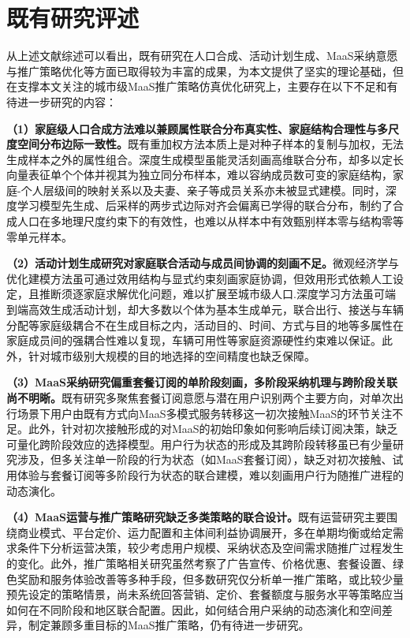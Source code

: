 \section{既有研究评述}\label{sec.review.comment}

从上述文献综述可以看出，既有研究在人口合成、活动计划生成、MaaS采纳意愿与推广策略优化等方面已取得较为丰富的成果，为本文提供了坚实的理论基础，但在支撑本文关注的城市级MaaS推广策略仿真优化研究上，主要存在以下不足和有待进一步研究的内容：

\textbf{（1）家庭级人口合成方法难以兼顾属性联合分布真实性、家庭结构合理性与多尺度空间分布边际一致性。}既有重加权方法本质上是对种子样本的复制与加权，无法生成样本之外的属性组合。深度生成模型虽能灵活刻画高维联合分布，却多以定长向量表征单个个体并视其为独立同分布样本，难以容纳成员数可变的家庭结构，家庭-个人层级间的映射关系以及夫妻、亲子等成员关系亦未被显式建模。同时，深度学习模型先生成、后采样的两步式边际对齐会偏离已学得的联合分布，制约了合成人口在多地理尺度约束下的有效性，也难以从样本中有效甄别样本零与结构零等零单元样本。

\textbf{（2）活动计划生成研究对家庭联合活动与成员间协调的刻画不足。}微观经济学与优化建模方法虽可通过效用结构与显式约束刻画家庭协调，但效用形式依赖人工设定，且推断须逐家庭求解优化问题，难以扩展至城市级人口.深度学习方法虽可端到端高效生成活动计划，却大多数以个体为基本生成单元，联合出行、接送与车辆分配等家庭级耦合不在生成目标之内，活动目的、时间、方式与目的地等多属性在家庭成员间的强耦合性难以复现，车辆可用性等家庭资源硬性约束难以保证。此外，针对城市级别大规模的目的地选择的空间精度也缺乏保障。

\textbf{（3）MaaS采纳研究偏重套餐订阅的单阶段刻画，多阶段采纳机理与跨阶段关联尚不明晰。}既有研究多聚焦套餐订阅意愿与潜在用户识别两个主要方向，对单次出行场景下用户由既有方式向MaaS多模式服务转移这一初次接触MaaS的环节关注不足。此外，针对初次接触形成的对MaaS的初始印象如何影响后续订阅决策，缺乏可量化跨阶段效应的选择模型。用户行为状态的形成及其跨阶段转移虽已有少量研究涉及，但多关注单一阶段的行为状态（如MaaS套餐订阅），缺乏对初次接触、试用体验与套餐订阅等多阶段行为状态的联合建模，难以刻画用户行为随推广进程的动态演化。

\textbf{（4）MaaS运营与推广策略研究缺乏多类策略的联合设计。}既有运营研究主要围绕商业模式、平台定价、运力配置和主体间利益协调展开，多在单期均衡或给定需求条件下分析运营决策，较少考虑用户规模、采纳状态及空间需求随推广过程发生的变化。此外，推广策略相关研究虽然考察了广告宣传、价格优惠、套餐设置、绿色奖励和服务体验改善等多种手段，但多数研究仅分析单一推广策略，或比较少量预先设定的策略情景，尚未系统回答营销、定价、套餐额度与服务水平等策略应当如何在不同阶段和地区联合配置。因此，如何结合用户采纳的动态演化和空间差异，制定兼顾多重目标的MaaS推广策略，仍有待进一步研究。

